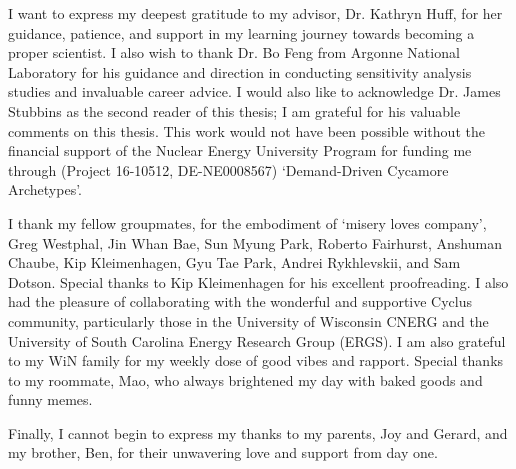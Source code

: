 I want to express my deepest gratitude to my advisor, 
Dr. Kathryn Huff, for her guidance, patience, and 
support in my learning journey towards becoming a proper scientist.
I also wish to thank Dr. Bo Feng from Argonne National 
Laboratory for his guidance and direction in conducting 
sensitivity analysis studies and invaluable career advice.  
I would also like to acknowledge Dr. James Stubbins as the 
second reader of this thesis; I am grateful for his valuable 
comments on this thesis. 
This work would not have been possible without the 
financial support of the Nuclear Energy University Program 
for funding me through (Project 16-10512, DE-NE0008567) 
`Demand-Driven Cycamore Archetypes'.

I thank my fellow groupmates, for the embodiment of `misery 
loves company', Greg Westphal, Jin Whan Bae, Sun Myung Park, 
Roberto Fairhurst, Anshuman Chaube, Kip Kleimenhagen, 
Gyu Tae Park, Andrei Rykhlevskii, and Sam Dotson. 
Special thanks to Kip Kleimenhagen for his excellent proofreading. 
I also had the pleasure of collaborating with the wonderful 
and supportive Cyclus community, particularly those in the 
University of Wisconsin \gls{CNERG} and the University of 
South Carolina Energy Research Group (ERGS). 
I am also grateful to my WiN family for my weekly dose 
of good vibes and rapport. 
Special thanks to my roommate, Mao, who always brightened my 
day with baked goods and funny memes. 

Finally, I cannot begin to express my thanks to my parents, 
Joy and Gerard, and my brother, Ben, for their unwavering love 
and support from day one. 

